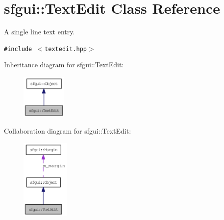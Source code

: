 \hypertarget{classsfgui_1_1TextEdit}{
\section{sfgui::TextEdit Class Reference}
\label{classsfgui_1_1TextEdit}
}
A single line text entry.  


{\tt \#include $<$textedit.hpp$>$}

Inheritance diagram for sfgui::TextEdit:\nopagebreak
\begin{figure}[H]
\begin{center}
\leavevmode
\includegraphics[width=62pt]{classsfgui_1_1TextEdit__inherit__graph}
\end{center}
\end{figure}
Collaboration diagram for sfgui::TextEdit:\nopagebreak
\begin{figure}[H]
\begin{center}
\leavevmode
\includegraphics[width=66pt]{classsfgui_1_1TextEdit__coll__graph}
\end{center}
\end{figure}
